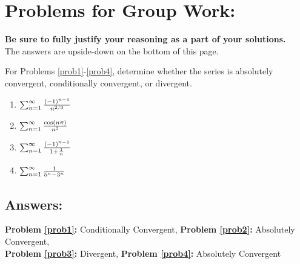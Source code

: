 \documentclass[10pt]{article}
\begin{document}
\pagebreak

\section*{Problems for Group Work:}
\textbf{Be sure to fully justify your reasoning as a part of your solutions.}\\
 The answers are upside-down on the bottom of this page.

For Problems \ref{prob1}-\ref{prob4}, determine whether the series is absolutely convergent, conditionally convergent, or divergent.

\begin{enumerate}


\item \(\sum_{n=1}^\infty \frac{(-1)^{n-1}}{n^{2/3}}\) \label{prob1}
\vspace*{2.5in}

\item \(\sum_{n=1}^\infty \frac{\cos(n\pi) }{n^3}\) \label{prob2}
\vspace*{2.5in}



\item \(\sum_{n=1}^\infty \frac{(-1)^{n-1}}{1+\frac{1}{n}}\) \label{prob3}
\vspace*{2.5in}

\item \(\sum_{n=1}^\infty \frac{1}{5^n-3^n}\) \label{prob4}
\vspace*{2.5in}


\end{enumerate}

\vfill

\subsection*{Answers:}
\textbf{Problem \ref{prob1}:} Conditionally Convergent,
\textbf{Problem \ref{prob2}:} Absolutely Convergent,\\
\textbf{Problem \ref{prob3}:} Divergent,
\textbf{Problem \ref{prob4}:} Absolutely Convergent

\end{document}
